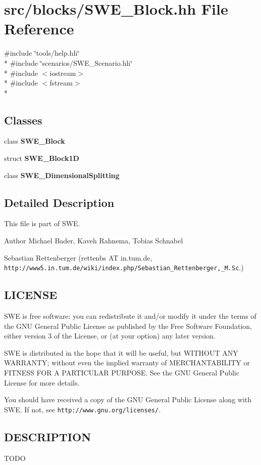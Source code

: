 \section{src/blocks/\-S\-W\-E\-\_\-\-Block.hh File Reference}
\label{SWE__Block_8hh}
{\ttfamily \#include \char`\"{}tools/help.\-hh\char`\"{}}\\*
{\ttfamily \#include \char`\"{}scenarios/\-S\-W\-E\-\_\-\-Scenario.\-hh\char`\"{}}\\*
{\ttfamily \#include $<$iostream$>$}\\*
{\ttfamily \#include $<$fstream$>$}\\*
\subsection*{Classes}
\begin{DoxyCompactItemize}
\item 
class {\bf S\-W\-E\-\_\-\-Block}
\item 
struct {\bf S\-W\-E\-\_\-\-Block1\-D}
\item 
class {\bf S\-W\-E\-\_\-\-Dimensional\-Splitting}
\end{DoxyCompactItemize}


\subsection{Detailed Description}
This file is part of S\-W\-E.

\begin{DoxyAuthor}{Author}
Michael Bader, Kaveh Rahnema, Tobias Schnabel 

Sebastian Rettenberger (rettenbs A\-T in.\-tum.\-de, {\tt http\-://www5.\-in.\-tum.\-de/wiki/index.\-php/\-Sebastian\-\_\-\-Rettenberger,\-\_\-\-M.\-Sc}.)
\end{DoxyAuthor}
\subsection{L\-I\-C\-E\-N\-S\-E}\label{Writer_8hh_LICENSE}
S\-W\-E is free software\-: you can redistribute it and/or modify it under the terms of the G\-N\-U General Public License as published by the Free Software Foundation, either version 3 of the License, or (at your option) any later version.

S\-W\-E is distributed in the hope that it will be useful, but W\-I\-T\-H\-O\-U\-T A\-N\-Y W\-A\-R\-R\-A\-N\-T\-Y; without even the implied warranty of M\-E\-R\-C\-H\-A\-N\-T\-A\-B\-I\-L\-I\-T\-Y or F\-I\-T\-N\-E\-S\-S F\-O\-R A P\-A\-R\-T\-I\-C\-U\-L\-A\-R P\-U\-R\-P\-O\-S\-E. See the G\-N\-U General Public License for more details.

You should have received a copy of the G\-N\-U General Public License along with S\-W\-E. If not, see {\tt http\-://www.\-gnu.\-org/licenses/}.\subsection{D\-E\-S\-C\-R\-I\-P\-T\-I\-O\-N}\label{NetCdfWriter_8hh_DESCRIPTION}
T\-O\-D\-O 